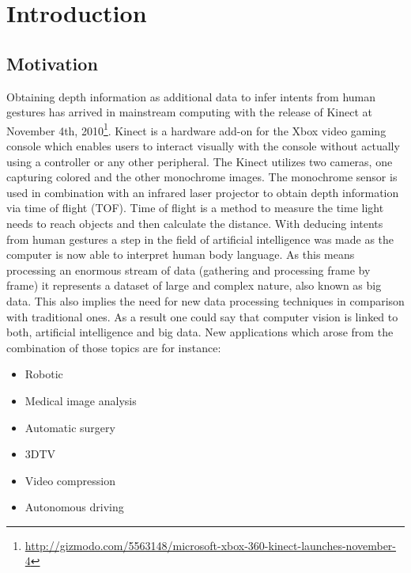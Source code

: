 \chapter{Introduction}
\label{chap:introduction}

\section{Motivation}

Obtaining depth information as additional data to infer intents from human gestures has arrived in mainstream computing with the release of Kinect at November 4th, 2010\footnote{\url{http://gizmodo.com/5563148/microsoft-xbox-360-kinect-launches-november-4}}.
Kinect is a hardware add-on for the Xbox video gaming console which enables users to interact visually with the console without actually using a controller or any other peripheral.
The Kinect utilizes two cameras, one capturing colored and the other monochrome images.
The monochrome sensor is used in combination with an infrared laser projector to obtain depth information via time of flight (TOF).
Time of flight is a method to measure the time light needs to reach objects and then calculate the distance.
\newline\newline\noindent With deducing  intents from human gestures a step in the field of artificial intelligence was made as the computer is now able to interpret human body language.
As this means processing an enormous stream of data (gathering and processing frame by frame) it represents a dataset of large and complex nature, also known as big data.
This also implies the need for new data processing techniques in comparison with traditional ones.
As a result one could say that computer vision is linked to both, artificial intelligence and big data.
New applications which arose from the combination of those topics are for instance:

\begin{itemize}
  \item Robotic
  \item Medical image analysis
  \item Automatic surgery
  \item 3DTV
  \item Video compression
  \item Autonomous driving
\end{itemize}

